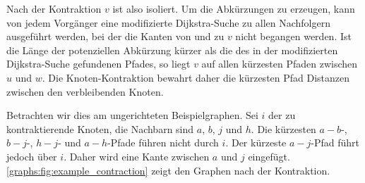 Nach der Kontraktion $v$ ist also isoliert.
Um die Abkürzungen zu erzeugen, kann von jedem Vorgänger eine modifizierte Dijkstra-Suche zu allen Nachfolgern ausgeführt werden, bei der die Kanten von und zu $v$ nicht begangen werden.
Ist die Länge der potenziellen Abkürzung kürzer als die des in der modifizierten Dijkstra-Suche gefundenen Pfades, so liegt $v$ auf allen kürzesten Pfaden zwischen $u$ und $w$.
Die Knoten-Kontraktion bewahrt daher die kürzesten Pfad Distanzen zwischen den verbleibenden Knoten.


Betrachten wir dies am ungerichteten Beispielgraphen.
Sei $i$ der zu kontraktierende Knoten, die Nachbarn sind $a$, $b$, $j$ und $h$.
Die kürzesten $a-b$-, $b-j$-, $h-j$- und $a-h$-Pfade führen nicht durch $i$.
Der kürzeste $a-j$-Pfad führt jedoch über $i$.
Daher wird eine Kante zwischen $a$ und $j$ eingefügt.
\autoref{graphs:fig:example_contraction} zeigt den Graphen nach der Kontraktion.

